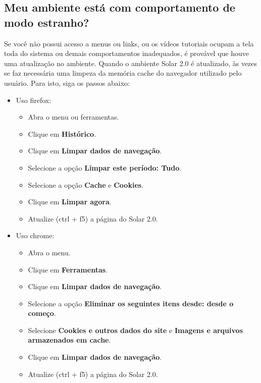 \documentclass[letterpaper,10pt,english]{sphinxmanual}
\begin{document}
\subsection{Meu ambiente está com comportamento de modo estranho?}
\label{faq:meu-ambiente-esta-com-comportamento-de-modo-estranho}
Se você não possui acesso a menus ou links, ou os vídeos tutoriais ocupam a tela toda do sistema ou demais comportamentos inadequados, é provável que houve uma atualização no ambiente. Quando o ambiente Solar 2.0 é atualizado, às vezes se faz necessária uma limpeza da memória cache do navegador utilizado pelo usuário. Para isto, siga os passos abaixo:
\begin{itemize}
\item {} 
Uso firefox:
\begin{itemize}
\item {} 
Abra o menu ou ferramentas.

\item {} 
Clique em \textbf{Histórico}.

\item {} 
Clique em \textbf{Limpar dados de navegação}.

\item {} 
Selecione a opção \textbf{Limpar este período: Tudo}.

\item {} 
Selecione a opção \textbf{Cache} e \textbf{Cookies}.

\item {} 
Clique em \textbf{Limpar agora}.

\item {} 
Atualize (ctrl + f5) a página do Solar 2.0.

\end{itemize}

\item {} 
Uso chrome:
\begin{itemize}
\item {} 
Abra o menu.

\item {} 
Clique em \textbf{Ferramentas}.

\item {} 
Clique em \textbf{Limpar dados de navegação}.

\item {} 
Selecione a opção \textbf{Eliminar os seguintes itens desde: desde o começo}.

\item {} 
Selecione \textbf{Cookies e outros dados do site} e \textbf{Imagens e arquivos armazenados em cache}.

\item {} 
Clique em \textbf{Limpar dados de navegação}.

\item {} 
Atualize (ctrl + f5) a página do Solar 2.0.

\end{itemize}

\end{itemize}
\end{document}
